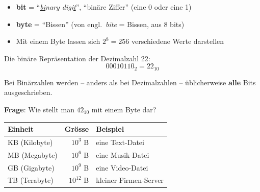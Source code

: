 \renewcommand{\thelektion}{L04 \textperiodcentered{} Bits, Bytes \& Hexadezimal}

\begin{frame}\end{frame}

{
\begin{frame}
\end{frame}}

\begin{frame}
\begin{itemize}[<+->]
	\item \textbf{bit} = \enquote{\textit{\underline{bi}nary digi\underline{t}}}, \enquote{binäre Ziffer} (eine 0 oder eine 1)
	\item \textbf{byte} = \enquote{Bissen} (von engl.\ \textit{bite} = Bissen, aus 8 bits) 
	\item Mit einem Byte lassen sich $2^8=256$ verschiedene Werte darstellen
\end{itemize}
\end{frame}

\begin{frame}
Die binäre Repräsentation der Dezimalzahl 22:
\[00010110_2 = 22_{10}\]
\begin{center}
Bei Binärzahlen werden -- anders als bei Dezimalzahlen -- üblicherweise \textbf{alle} Bits ausgeschrieben.
\end{center}
\vspace{3mm}
\begin{center}
\textbf{Frage}: Wie stellt man $42_{10}$ mit einem Byte dar?
\end{center}
\end{frame}

\begin{frame}
\begin{table}[H]
	\footnotesize
	\centering
	\begin{tabular}{@{}l|rl@{}}
		\midrule
		\textbf{Einheit} & \textbf{Grösse} & Beispiel \\ \midrule
		KB (Kilobyte) & $10^3$ B & eine Text-Datei \\
		MB (Megabyte) & $10^6$ B & eine Musik-Datei \\
		GB (Gigabyte) & $10^9$ B & eine Video-Datei \\
		TB (Terabyte) & $10^{12}$ B & kleiner Firmen-Server \\
		\midrule
	\end{tabular}
\end{table}
\end{frame}


